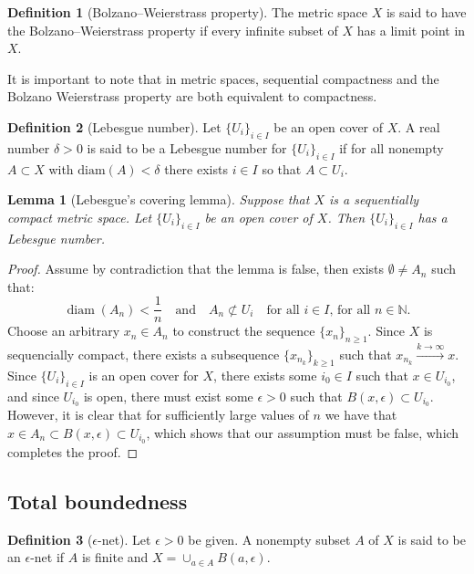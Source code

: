 \documentclass[11pt,a4paper]{article}
\theoremstyle{definition}
\newtheorem{definition}{Definition}[section]
\theoremstyle{plain}
\newtheorem{lemma}[theorem]{Lemma}
\DeclareMathOperator{\diam}{diam}
\newcommand{\N}{\mathbb{N}}
\newcommand{\tand}{\quad \text{and} \quad}
\begin{document}
  \begin{definition}[Bolzano--Weierstrass property]
    The metric space $X$ is said to have the 
    Bolzano--Weierstrass property if every infinite subset of 
    $X$ has a limit point in $X$.
  \end{definition}

  It is important to note that in metric spaces, sequential compactness and 
  the Bolzano Weierstrass property are both
  equivalent to compactness.
  
  \begin{definition}[Lebesgue number]
    Let $\{U_i\}_{i \in I}$ be an open cover of $X$. A real number 
    $\delta > 0$ is said to be a Lebesgue number
    for $\{U_i\}_{i \in I}$
    if for all nonempty $A \subset X$ with $\text{diam}(A) < \delta$
    there exists $i \in I$ so that $A \subset U_i$.
  \end{definition}

  \begin{lemma}[Lebesgue’s covering lemma]
    Suppose that $X$ is a sequentially compact metric space. 
    Let $\{U_i\}_{i \in I}$ be an open cover of $X$. 
    Then $\{U_i\}_{i \in I}$ has a Lebesgue number.
  \end{lemma}
  \begin{proof}
    Assume by contradiction that the lemma is false, 
    then exists $\emptyset \neq A_n$ such that:
    \[
      \diam(A_n) < \frac{1}{n} \tand A_n \not\subset U_i 
      \quad\text{for all $i \in I$, for all $n \in \N$}.
    \]
    Choose an arbitrary $x_n \in A_n$ to construct the sequence 
    $\{x_n\}_{n \geq 1}$.
    Since $X$ is sequencially compact, there exists a subsequence
    $\{x_{n_k}\}_{k \geq 1}$ such that $x_{n_k} \xrightarrow{k \to \infty} x$.
    Since $\{U_i\}_{i \in I}$ is an open cover for $X$, there exists
    some $i_0 \in I$ such that $x \in U_{i_0}$, and since $U_{i_0}$ is open,
    there must exist some $\epsilon > 0$ such that 
    $B(x,\epsilon) \subset U_{i_0}$.
    However, it is clear that for sufficiently large values of $n$ we have
    that $x \in A_n \subset B(x,\epsilon) \subset U_{i_0}$, which shows
    that our assumption must be false, which completes the proof.
  \end{proof}

  \subsection{Total boundedness}

  \begin{definition}[$\epsilon$-net]
    Let $\epsilon > 0$ be given. A nonempty subset $A$ of $X$ is 
    said to be an $\epsilon$-net if $A$ is finite and 
    $X = \cup_{a \in A}{B(a, \epsilon)}$.
  \end{definition}
\end{document}
